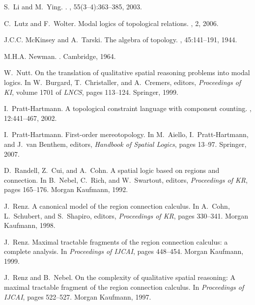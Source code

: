 \documentclass{LMCS}
\theoremstyle{plain}
\begin{document}
\begin{thebibliography}{10}
S.~Li and M.~Ying.
.
, 55(3--4):363--385, 2003.

C.~Lutz and F.~Wolter.
\newblock Modal logics of topological relations.
, 2, 2006.

J.C.C. McKinsey and A.~Tarski.
\newblock The algebra of topology.
, 45:141--191, 1944.

M.H.A. Newman.
.
\newblock Cambridge, 1964.

W.~Nutt.
\newblock On the translation of qualitative spatial reasoning problems into
  modal logics.
\newblock In W.~Burgard, T.~Christaller, and A.~Cremers, editors, {\em
  Proceedings of KI}, volume 1701 of {\em LNCS}, pages 113--124. Springer,
  1999.

I.~Pratt-Hartmann.
\newblock A topological constraint language with component counting.
, 12:441--467, 2002.

I.~Pratt-Hartmann.
\newblock First-order mereotopology.
\newblock In M.~Aiello, I.~Pratt-Hartmann, and J.~van Benthem, editors, {\em
  Handbook of Spatial Logics}, pages 13--97. Springer, 2007.

D.~Randell, Z.~Cui, and A.~Cohn.
\newblock A spatial logic based on regions and connection.
\newblock In B.~Nebel, C.~Rich, and W.~Swartout, editors, {\em Proceedings of
  KR}, pages 165--176. Morgan Kaufmann, 1992.

J.~Renz.
\newblock A canonical model of the region connection calculus.
\newblock In A.~Cohn, L.~Schubert, and S.~Shapiro, editors, {\em Proceedings of
  KR}, pages 330--341. Morgan Kaufmann, 1998.

J.~Renz.
\newblock Maximal tractable fragments of the region connection calculus: a
  complete analysis.
\newblock In {\em Proceedings of IJCAI}, pages 448--454. Morgan Kaufmann, 1999.

J.~Renz and B.~Nebel.
\newblock On the complexity of qualitative spatial reasoning: A maximal
  tractable fragment of the region connection calculus.
\newblock In {\em Proceedings of IJCAI}, pages 522--527. Morgan Kaufmann, 1997.


\end{thebibliography}
\end{document}

